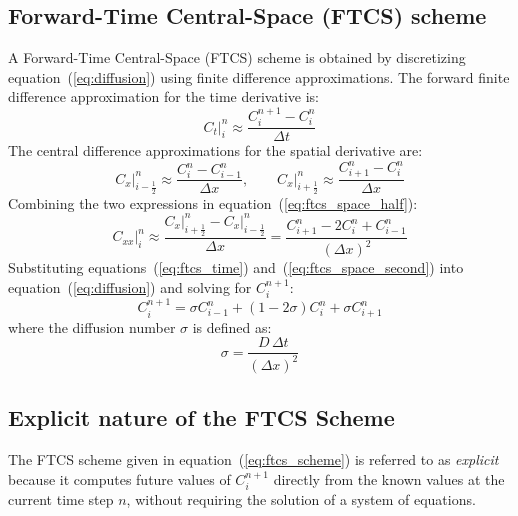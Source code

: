 \documentclass[a4paper,12pt]{article} %
\begin{document}
\subsection{Forward-Time Central-Space (FTCS) scheme}
A Forward-Time Central-Space (FTCS) scheme is obtained by discretizing equation~(\ref{eq:diffusion}) using finite difference approximations. The forward finite difference approximation for the time derivative is:
\begin{equation}
    \label{eq:ftcs_time}
    \left.C_{t}\right|_i^n \approx \frac{C_{i}^{n+1}-C_i^n}{\Delta t}
\end{equation}
The central difference approximations for the spatial derivative are:
\begin{equation}
    \label{eq:ftcs_space_half}
    \left.C_{x}\right|_{i-\frac{1}{2}}^n \approx \frac{C_{i}^{n}-C_{i-1}^n}{\Delta x},
    \qquad
    \left.C_{x}\right|_{i+\frac{1}{2}}^n \approx \frac{C_{i+1}^{n}-C_{i}^n}{\Delta x}
\end{equation}
Combining the two expressions in equation~(\ref{eq:ftcs_space_half}):
\begin{equation}
    \label{eq:ftcs_space_second}
    \left.C_{xx}\right|_i^n \approx \frac{\left.C_{x}\right|_{i+\frac{1}{2}}^n - \left.C_{x}\right|_{i-\frac{1}{2}}^n}{\Delta x}
    = \frac{C_{i+1}^n - 2C_{i}^n + C_{i-1}^n}{\left(\Delta x\right)^2}
\end{equation}
Substituting equations~(\ref{eq:ftcs_time}) and~(\ref{eq:ftcs_space_second}) into equation~(\ref{eq:diffusion}) and solving for $C_i^{n+1}$:
\begin{equation}
    \label{eq:ftcs_scheme}
    C_i^{n+1} = \sigma C_{i-1}^n + \left(1 - 2\sigma\right)C_{i}^n + \sigma C_{i+1}^n
\end{equation}
where the diffusion number $\sigma$ is defined as:
\begin{equation}
    \label{eq:sigma}
    \sigma = \frac{D\,\Delta t}{\left(\Delta x\right)^2}
\end{equation}

\subsection{Explicit nature of the FTCS Scheme}
The FTCS scheme given in equation~(\ref{eq:ftcs_scheme}) is referred to as \emph{explicit} because it computes future values of $C_{i}^{n+1}$ directly from the known values at the current time step $n$, without requiring the solution of a system of equations.
\end{document}

